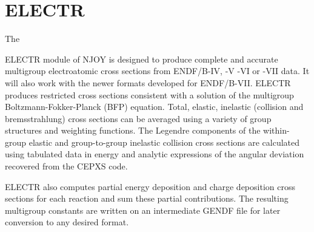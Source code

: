 \section{ELECTR}
\label{sELECTR}

\hypertarget{sELECTRhy}{The}
ELECTR module of NJOY is designed to
produce complete and accurate multigroup electroatomic
 cross sections from ENDF/B-IV, -V -VI or
-VII data\cite{HUGO}. It will also work with the newer formats
developed for ENDF/B-VII. ELECTR produces restricted cross
sections consistent with a solution
of the multigroup Boltzmann-Fokker-Planck (BFP)
equation. Total, elastic, inelastic (collision and bremss\-trahlung)
cross sections can be averaged using a variety of group
structures and weighting
functions. The Legendre components of the
within-group elastic and group-to-group inelastic collision cross sections
are calculated using tabulated data in energy and analytic expressions of
the angular deviation recovered from the CEPXS code\cite{CEPXS}.

ELECTR also computes partial energy deposition and charge deposition
cross sections for each reaction and sum these partial contributions.
The resulting multigroup constants are written on an intermediate
GENDF file for later conversion to any desired format.

